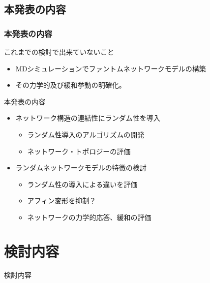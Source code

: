\documentclass[11pt, dvipdfmx]{beamer}
\begin{document}
\subsection{本発表の内容}
\begin{frame}
\frametitle{本発表の内容}

\large
\begin{alertblock}{これまでの検討で出来ていないこと}
\begin{itemize}
\item
MDシミュレーションでファントムネットワークモデルの構築
\item
その力学的及び緩和挙動の明確化。
\end{itemize}

\end{alertblock}

\vspace{-1mm}
\begin{block}{本発表の内容}
\begin{itemize}
\item
ネットワーク構造の連結性にランダム性を導入
\large
	\begin{itemize}
	\item
	ランダム性導入のアルゴリズムの開発
	\item
	ネットワーク・トポロジーの評価
	\end{itemize}
\item
ランダムネットワークモデルの特徴の検討
\large
	\begin{itemize}
	\item
	ランダム性の導入による違いを評価
	\item
	アフィン変形を抑制？
	\item
	ネットワークの力学的応答、緩和の評価
	\end{itemize}
\end{itemize}
\end{block}
\normalsize
\end{frame}
\section{検討内容}
\begin{frame}
\LARGE{検討内容}
\end{frame}
\end{document}
